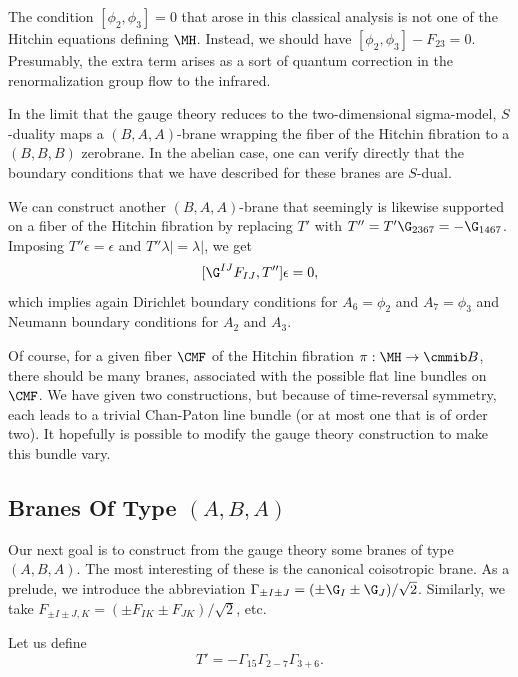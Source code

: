 The condition $[\phi_2,\phi_3]=0$ that arose in this classical
analysis is not one of the Hitchin equations defining $\MH$.
Instead, we should have $[\phi_2,\phi_3]-F_{23}=0$. Presumably,
the extra term arises as a sort of quantum correction in the
renormalization group flow to the infrared.

In the limit that the gauge theory reduces to the two-dimensional
sigma-model, $S$-duality maps a $(B,A,A)$-brane wrapping the fiber
of the Hitchin fibration to a $(B,B,B)$ zerobrane. In the abelian
case, one can verify directly that the boundary conditions that we
have described for these branes are $S$-dual.

We can construct another $(B,A,A)$-brane that seemingly is
likewise supported on a fiber of the Hitchin fibration by
replacing $T'$ with $T''=T'\G_{2367}=-\G_{1467}$.  Imposing
$T''\epsilon=\epsilon$ and $T''\lambda\vert=\lambda\vert$, we get
\setcounter{equation}{26}
\begin{equation}\label{eq:loppo}
[\G^{IJ}F_{IJ},T'']\epsilon=0,
\end{equation}
 which implies again
Dirichlet boundary conditions for $A_6=\phi_2$ and $A_7=\phi_3$
and Neumann boundary conditions for $A_2$ and $A_3$.

Of course, for a given fiber ${\CMF}$ of the Hitchin fibration
$\pi:\MH\to{{\cmmib B}}$, there should be many branes, associated
with the possible flat line bundles on ${\CMF}$.  We have given
two constructions, but because of time-reversal symmetry, each
leads to a trivial Chan-Paton line bundle (or at most one that is
of order two).  It hopefully is possible to modify the gauge
theory construction to make this bundle vary.

\subsection{Branes Of Type $(A,B,A)$}\label{sec:xgoto}

Our next goal is to construct from the gauge theory some branes of
type $(A,B,A)$. The most interesting of these is the canonical
coisotropic brane. As a prelude, we introduce the abbreviation
$\Gamma_{\pm I\pm J}=(\pm \G_I\pm \G_J)/\sqrt 2$. Similarly, we
take $F_{\pm I\pm J,K}=(\pm F_{IK}\pm F_{JK})/\sqrt 2$, etc.

Let us define %
\setcounter{equation}{27}
\begin{equation}\label{eq:jokko}
T'=-\Gamma_{15}\Gamma_{2-7}\Gamma_{3+6}.
\end{equation}

